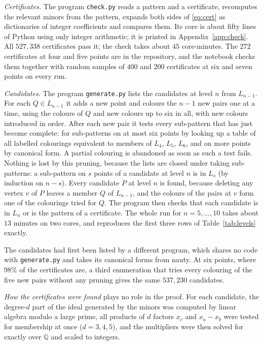 \documentclass[11pt]{amsart}
\theoremstyle{definition}
\theoremstyle{remark}
\newcommand{\Q}{\mathbb{Q}}
\begin{document}
\emph{Certificates.} The program \texttt{check.py} reads a pattern and a certificate, recomputes the
relevant minors from the pattern, expands both sides of \eqref{eq:cert} as dictionaries of integer
coefficients and compares them. Its core is about fifty lines of Python using only integer arithmetic; it
is printed in Appendix~\ref{app:check}. All $527{,}338$ certificates pass it; the check takes about $45$
core-minutes. The $272$ certificates at four and five points are in the repository, and the notebook
checks them together with random samples of $400$ and $200$ certificates at six and seven points on every
run.

\emph{Candidates.} The program \texttt{generate.py} lists the candidates at level $n$ from $L_{n-1}$. For
each $Q\in L_{n-1}$ it adds a new point and colours the $n-1$ new pairs one at a time, using the colours of
$Q$ and new colours up to six in all, with new colours introduced in order. After each new pair it tests
every sub-pattern that has just become complete: for sub-patterns on at most six points by looking up a
table of all labelled colourings equivalent to members of $L_4$, $L_5$, $L_6$, and on more points by
canonical form. A partial colouring is abandoned as soon as such a test fails. Nothing is lost by this
pruning, because the lists are closed under taking sub-patterns: a sub-pattern on $s$ points of a candidate
at level $n$ is in $L_s$ (by induction on $n-s$). Every candidate $P$ at level $n$ is found, because
deleting any vertex $v$ of $P$ leaves a member $Q$ of $L_{n-1}$, and the colours of the pairs at $v$ form
one of the colourings tried for $Q$. The program then checks that each candidate is in $L_n$ or is the
pattern of a certificate. The whole run for $n=5,\dots,10$ takes about $13$ minutes on two cores, and
reproduces the first three rows of Table~\ref{tab:levels} exactly.

The candidates had first been listed by a different program, which shares no code with
\texttt{generate.py} and takes its canonical forms from nauty. At six points, where $98\%$ of the
certificates are, a third enumeration that tries every colouring of the five new pairs without any pruning
gives the same $537{,}230$ candidates.

\emph{How the certificates were found} plays no role in the proof. For each candidate, the degree-$d$
part of the ideal generated by the minors was computed by linear algebra modulo a large prime, all products
of $d$ factors $x_c$ and $x_a-x_b$ were tested for membership at once ($d=3,4,5$), and the multipliers were
then solved for exactly over $\Q$ and scaled to integers.
\end{document}
